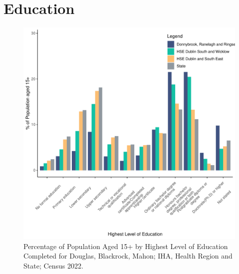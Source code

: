 \documentclass{article}
\begin{document}
\section{Education}\label{sect:Edu}
\begin{figure}[H]
	\centering
	\includegraphics[width = 120mm]{../figures/EduED.pdf}
	\caption{Percentage of Population Aged 15+ by Highest Level of Education Completed for Douglas, Blackrock, Mahon; IHA, Health Region and State; Census 2022.}
	\label{fig:vbnv}
	\end{figure}
\end{document}
